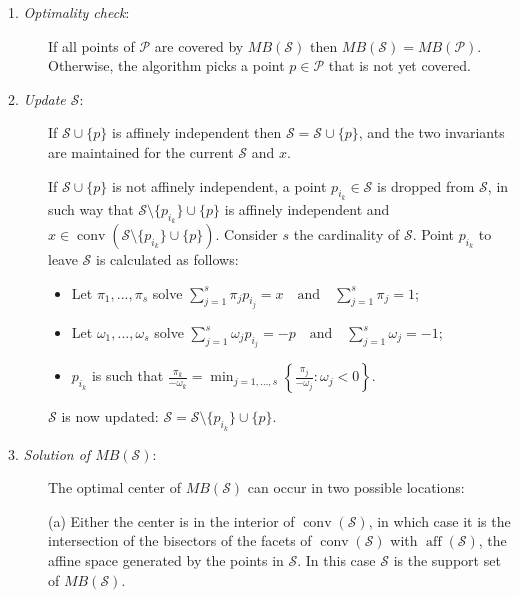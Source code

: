 \begin{description}
	\item[1. \emph{Optimality check}:] If all points of ${\mathcal{P}}$ are covered by $MB({\mathcal{S}})$ then $MB({\mathcal{S}})=MB({\mathcal{P}})$. Otherwise, the algorithm picks a point ${{p}}\in{\mathcal{P}}$ that is not yet covered. 
	\bigskip
	
	\item[2. \emph{Update ${\mathcal{S}}$}:] If ${\mathcal{S}}\cup\{{{p}}\}$ is affinely independent then ${\mathcal{S}}={\mathcal{S}}\cup\{{{p}}\}$, and the two invariants are maintained for the current ${\mathcal{S}}$ and $x$. 

	If ${\mathcal{S}}\cup\{{{p}}\}$ is not affinely independent, a point $p_{i_k}\in{\mathcal{S}}$ is dropped from ${\mathcal{S}}$, in such way that ${\mathcal{S}}\setminus\{p_{i_k}\}\cup\{{{p}}\}$ is affinely independent and $x\in{\operatorname{conv}}({\mathcal{S}}\setminus\{p_{i_k}\}\cup\{{{p}}\})$. Consider $s$ the cardinality of ${\mathcal{S}}$. Point $p_{i_k}$ to leave ${\mathcal{S}}$ is calculated as follows:

	\begin{itemize}
		\item Let $\pi_1,...,\pi_s$ solve  $\displaystyle\sum^s_{j=1} \pi_j p_{i_j} = x\quad\text{and}\quad \sum^s_{j=1} \pi_j=1$\label{upS1};
		\item Let $\omega_1,...,\omega_s$ solve  $\displaystyle\sum^s_{j=1} \omega_j p_{i_j} = -{{p}}\quad\text{and}\quad \sum^s_{j=1} \omega_j=-1$\label{upS2};		
		\item $p_{i_k}$ is such that $\displaystyle\frac{\pi_k}{-\omega_k} = \min_{j=1,\dots,s} \left\{\frac{\pi_j}{-\omega_j}: \omega_j<0\right\}$\label{upS3}.
	\end{itemize}
	${\mathcal{S}}$ is now updated: ${\mathcal{S}}={\mathcal{S}}\setminus \{p_{i_k}\}\cup\{{{p}}\}$. 
	
	\bigskip
	
	\item[3. \emph{Solution of $MB({\mathcal{S}})$}:]  The optimal center of $MB({\mathcal{S}})$ can occur in two possible locations:
	
	(a) Either the center is in the interior of ${\operatorname{conv}}({\mathcal{S}})$, in which case it is the intersection of the bisectors of the facets of ${\operatorname{conv}}({\mathcal{S}})$ with ${\operatorname{aff}}({\mathcal{S}})$, the affine space generated by the points in ${\mathcal{S}}$. In this case ${\mathcal{S}}$ is the support set of $MB({\mathcal{S}})$.
	

\end{description}
